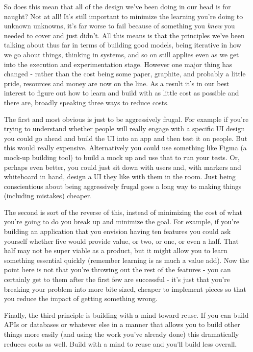 \documentclass[11pt,a5paper]{book}
\begin{document}
So does this mean that all of the design we've been doing in our head is for naught? Not at all! It's still important to minimize the learning you're doing to unknown unknowns, it's far worse to fail because of something you \textit{knew} you needed to cover and just didn't. All this means is that the principles we've been talking about thus far in terms of building good models, being iterative in how we go about things, thinking in systems, and so on still applies even as we get into the execution and experimentation stage. However one major thing has changed - rather than the cost being some paper, graphite, and probably a little pride, resources and money are now on the line. As a result it's in our best interest to figure out how to learn and build with as little cost as possible and there are, broadly speaking \cite{macmillan} \cite{patton} three ways to reduce costs. 
\newline

The first and most obvious is just to be aggressively frugal. For example if you're trying to understand whether people will really engage with a specific UI design you could go ahead and build the UI into an app and then test it on people. But this would really expensive. Alternatively you could use something like Figma (a mock-up building tool) to build a mock up and use that to run your tests. Or, perhaps even better, you could just sit down with users and, with markers and whiteboard in hand, design a UI they like with them in the room. Just being conscientious about being aggressively frugal goes a long way to making things (including mistakes) cheaper.
\newline

The second is sort of the reverse of this, instead of minimizing the cost of what you're going to do you break up and minimize the goal. For example, if you're building an application that you envision having ten features you could ask yourself whether five would provide value, or two, or one, or even a half. That half may not be super viable as a product, but it might allow you to learn something essential quickly (remember learning is as much a value add). Now the point here is not that you're throwing out the rest of the features - you can certainly get to them after the first few are successful - it's just that you're breaking your problem into more bite sized, cheaper to implement pieces so that you reduce the impact of getting something wrong. 
\newline

Finally, the third principle is building with a mind toward reuse. If you can build APIs or databases or whatever else in a manner that allows you to build other things more easily (and using the work you've already done) this dramatically reduces costs as well. Build with a mind to reuse and you'll build less overall.
\newline
\end{document}
